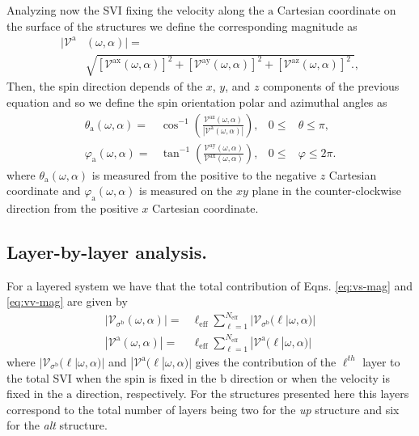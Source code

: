 \documentclass[prb,11pt,tightenlines,twocolumn,aps]{revtex4-1}
\begin{document}
Analyzing now the SVI fixing the velocity along the $\mathrm{a}$ Cartesian
coordinate on the surface of the structures we define the corresponding
magnitude as
\begin{align}
|\mathcal{V}^{\mathrm{a}}&(\omega,\alpha)| = \nonumber \\
&\sqrt { 
[\mathcal{V}^{\mathrm{ax}}(\omega,\alpha)]^{2} +
[\mathcal{V}^{\mathrm{ay}}(\omega,\alpha)]^{2} +
[\mathcal{V}^{\mathrm{az}}(\omega,\alpha)]^{2} .
},
\label{eq:vv-mag}
\end{align}
{\color{red} Then, the spin direction depends of the $x$, $y$, and $z$
components of the previous equation and so we define the spin orientation polar
and azimuthal angles as}
\begin{align}
\theta_{\mathrm{a}}  (\omega,\alpha)
=& 
\cos^{-1} \left( \frac{\mathcal{V}^{\mathrm{az}}(\omega,\alpha)}
{|\mathcal{V}^{\mathrm{a}}(\omega,\alpha)|} \right),
& 0 \leq &\theta \leq \pi, 
\label{eq:polar-ang}
\\
\varphi_{\mathrm{a}} (\omega,\alpha)
=& 
\tan^{-1} \left( \frac{\mathcal{V}^{\mathrm{ay}}(\omega,\alpha)}
{\mathcal{V}^{\mathrm{ax}}(\omega,\alpha)} \right),
& 0 \leq &\varphi \leq 2\pi.
\label{eq:azimuthal-ang} 
\end{align}
{\color{red} where $\theta_{\mathrm{a}}(\omega,\alpha)$ is measured from the
positive to the negative $z$ Cartesian coordinate and
$\varphi_{\mathrm{a}}(\omega,\alpha)$ is measured on the $xy$ plane in the
counter-clockwise direction from the positive $x$ Cartesian coordinate.}




\subsection{Layer-by-layer analysis.}\label{sec:theory-layer}

For a layered system we have that the total contribution of Eqns. 
\eqref{eq:vs-mag} and \eqref{eq:vv-mag} are given \cite{arzatePRB14} by 
\begin{align}
|\mathcal{V}_{\sigma^{\mathrm{b}}}(\omega,\alpha)|
=& 
\ell_{\mathrm{eff}}
\sum_{\ell=1}^{N_{\mathrm{eff}}}
|\mathcal{V}_{\sigma^{\mathrm{b}}} (\ell | \omega,\alpha)|
\label{eq:vs-layer}
\\
|\mathcal{V}^{\mathrm{a}}(\omega,\alpha)|
=&
\ell_{\mathrm{eff}}
\sum_{\ell=1}^{N_{\mathrm{eff}}}
|\mathcal{V}^{\mathrm{a}} (\ell | \omega,\alpha)|
\label{eq:vv-layer}
\end{align}
where $|\mathcal{V}_{\sigma^{\mathrm{b}}} (\ell | \omega,\alpha)|$ and
$|\mathcal{V}^{\mathrm{a}} (\ell | \omega,\alpha)|$ gives the contribution of
the $\ell^{th}$ layer to the total SVI when the spin is fixed in the
$\mathrm{b}$ direction or when the velocity is fixed in the $\mathrm{a}$
direction, respectively. For the structures presented here this layers
correspond to the total number of layers being two for the \emph{up} structure
and six for the \emph{alt} structure.
\end{document}
